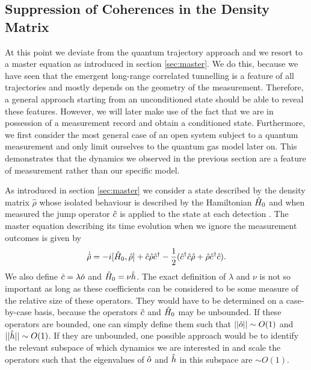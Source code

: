 \subsection{Suppression of Coherences in the Density Matrix}

At this point we deviate from the quantum trajectory approach and we
resort to a master equation as introduced in section
\ref{sec:master}. We do this, because we have seen that the emergent
long-range correlated tunnelling is a feature of all trajectories and
mostly depends on the geometry of the measurement. Therefore, a
general approach starting from an unconditioned state should be able
to reveal these features. However, we will later make use of the fact
that we are in possession of a measurement record and obtain a
conditioned state. Furthermore, we first consider the most general
case of an open system subject to a quantum measurement and only limit
ourselves to the quantum gas model later on. This demonstrates that
the dynamics we observed in the previous section are a feature of
measurement rather than our specific model.

As introduced in section \ref{sec:master} we consider a state
described by the density matrix $\hat{\rho}$ whose isolated behaviour
is described by the Hamiltonian $\hat{H}_0$ and when measured the jump
operator $\hat{c}$ is applied to the state at each detection
\cite{MeasurementControl}. The master equation describing its time
evolution when we ignore the measurement outcomes is given by
\begin{equation}
  \dot{\hat{\rho}} = -i [ \hat{H}_0 , \hat{\rho} ] + \hat{c} \hat{\rho} \hat{c}^\dagger - \frac{1}{2}(
  \hat{c}^\dagger\hat{c} \hat{\rho} + \hat{\rho} \hat{c}^\dagger\hat{c} ).
\end{equation}
We also define $\hat{c} = \lambda \hat{o}$ and $\hat{H}_0 = \nu \hat{h}$. The exact
definition of $\lambda$ and $\nu$ is not so important as long as these
coefficients can be considered to be some measure of the relative size
of these operators. They would have to be determined on a case-by-case
basis, because the operators $\hat{c}$ and $\hat{H}_0$ may be unbounded. If
these operators are bounded, one can simply define them such that
$||\hat{o}|| \sim O(1)$ and $||\hat{h}|| \sim O(1)$. If they are unbounded, one
possible approach would be to identify the relevant subspace of which
dynamics we are interested in and scale the operators such that the
eigenvalues of $\hat{o}$ and $\hat{h}$ in this subspace are $\sim O(1)$.

